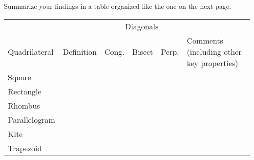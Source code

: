 \begin{prob}
Summarize your findings in a table organized like the one on the next page.  
\newpage 

\renewcommand\arraystretch{3}
\renewcommand\tabcolsep{12pt}
\begin{table}[h]
\begin{tabular}{|l|p{6cm}|c|c|c|p{8cm}|}
\hline 
 &   & \multicolumn{3}{c|}{Diagonals} &  \\  %
Quadrilateral & Definition  & \begin{sideways}Cong.\end{sideways} & 
\begin{sideways}Bisect\end{sideways} & \begin{sideways}Perp.\end{sideways} & Comments (including other key properties) \\ \hline\hline
Square           &            &   &  &         &                  \\  \hline
Rectangle       &           &   &  &         &                  \\ \hline
Rhombus        &           &   &  &         &                  \\ \hline
Parallelogram &           &   &  &         &                  \\ \hline
Kite                &           &   &  &          &                  \\ \hline
Trapezoid       &           &   &  &         &                  \\ \hline
\end{tabular}
\end{table}

\end{prob}




